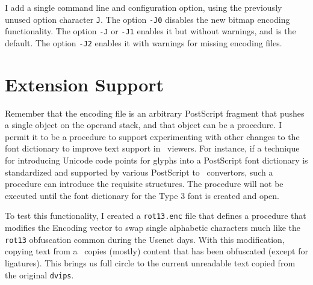 \documentclass{ltugboat}
\def\PDF{\acro{PDF}}
\def\dvips{\texttt{dvips}}
\begin{document}
I add a single command line and configuration option, using the
previously unused option character \texttt{J}.  The option
\texttt{-J0} disables the new bitmap encoding functionality.
The option \texttt{-J} or \texttt{-J1} enables it but without
warnings, and is the default.  The option \texttt{-J2} enables
it with warnings for missing encoding files.

\section{Extension Support}

Remember that the encoding file is an arbitrary PostScript fragment
that pushes a single object on the operand stack, and that object
can be a procedure.  I permit it to be a procedure to support
experimenting with other changes to the font dictionary to improve
text support in \PDF\ viewers.  For instance, if a technique for
introducing Unicode code points for glyphs into a PostScript font
dictionary is standardized and supported by various PostScript
to \PDF\ convertors, such a procedure can introduce the requisite
structures.  The procedure will not be executed until the
font dictionary for the Type 3 font is created and open.

To test this functionality, I created a \texttt{rot13.enc} file
that defines a procedure that modifies the Encoding vector to swap
single alphabetic characters much like the \texttt{rot13} obfuscation
common during the Usenet days.  With this modification, copying
text from a \PDF\ copies (mostly) content that has been obfuscated
(except for ligatures).  This brings us full circle to the
current unreadable text copied from the original \dvips.

\SetBibJustification{\raggedright}



\makesignature
\end{document}
